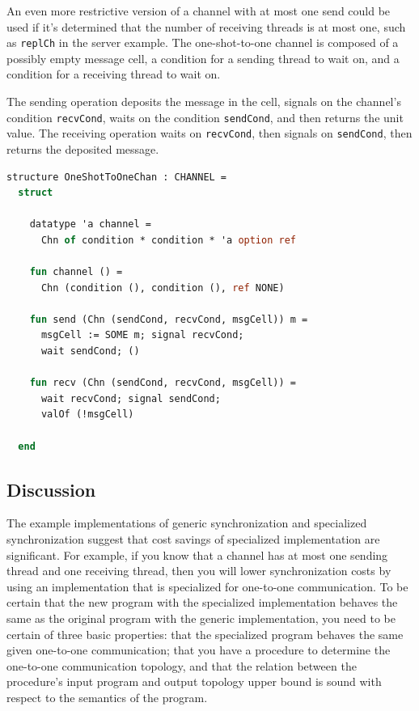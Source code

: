 \documentclass[10pt]{article}
\begin{document}
An even more restrictive version of a channel with at most one send could be used if it's
determined that the number of receiving threads is at most one,
such as \lstinline{replCh} in the server example.
The one-shot-to-one channel is
composed of a possibly empty message cell, a condition for a sending thread to wait on,
and a condition for a receiving thread to wait on.

The sending operation deposits the message in the cell, signals on the channel's condition \lstinline{recvCond},
waits on the condition \lstinline{sendCond}, and then returns the unit value.
The receiving operation waits on \lstinline{recvCond},
then signals on \lstinline{sendCond}, then returns the deposited message.

\begin{lstlisting}[language=ML, mathescape]
  structure OneShotToOneChan : CHANNEL =
  struct

    datatype 'a channel =
      Chn of condition * condition * 'a option ref

    fun channel () =
      Chn (condition (), condition (), ref NONE)

    fun send (Chn (sendCond, recvCond, msgCell)) m =
      msgCell := SOME m; signal recvCond;  
      wait sendCond; ()

    fun recv (Chn (sendCond, recvCond, msgCell)) =
      wait recvCond; signal sendCond;
      valOf (!msgCell)

  end
\end{lstlisting}


\subsection{Discussion}
The example implementations of generic synchronization and specialized synchronization suggest
that cost savings of specialized implementation are significant. For example, if you know that
a channel has at most one sending thread and one receiving thread, then you will
lower synchronization costs by
using an implementation that is specialized for one-to-one communication.  To be certain that
the new program with the specialized implementation behaves the same as the original program
with the generic implementation, you need to be certain of three basic properties: that the
specialized program behaves the same given one-to-one communication; that you have a procedure
to determine the one-to-one communication topology, and that the relation between the
procedure's input program and output topology upper bound is sound with respect to the
semantics of the program.  
\end{document}
